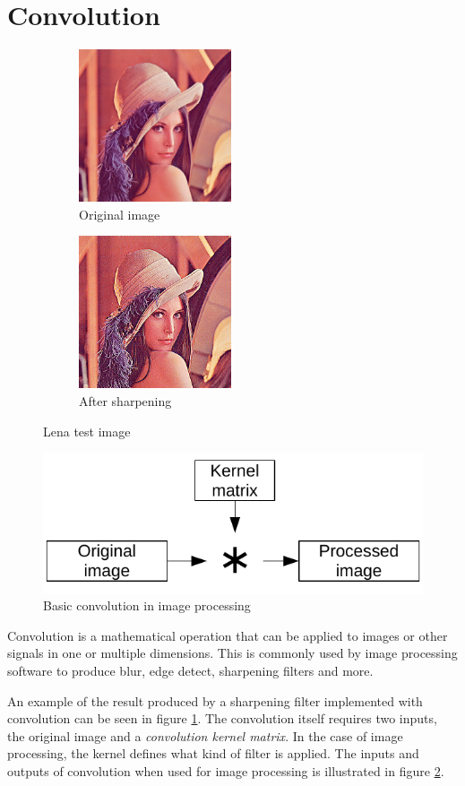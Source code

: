 \section{Convolution}
\begin{figure}
    \centering
    \begin{subfigure}{5cm}
        \centering
        \includegraphics[width=4.5cm]{img/Lena}
        \caption{Original image}
    \end{subfigure}
    \begin{subfigure}{5cm}
        \centering
        \includegraphics[width=4.5cm]{img/LenaProcessed}
        \caption{After sharpening}
    \end{subfigure}
    \caption{Lena test image}
    \label{fig:lena}
\end{figure}
\begin{figure}
    \centering
    \includegraphics{img/BasicConvolution}
    \caption{Basic convolution in image processing}
    \label{fig:BasicConvolution}
\end{figure}

Convolution is a mathematical operation that can be applied to images or other signals in one or multiple dimensions.
This is commonly used by image processing software to produce blur, edge detect, sharpening filters and more.

An example of the result produced by a sharpening filter implemented with convolution can be seen in figure \ref{fig:lena}.
The convolution itself requires two inputs, the original image and a \textit{convolution kernel matrix}.
In the case of image processing, the kernel defines what kind of filter is applied.
The inputs and outputs of convolution when used for image processing is illustrated in figure \ref{fig:BasicConvolution}.
